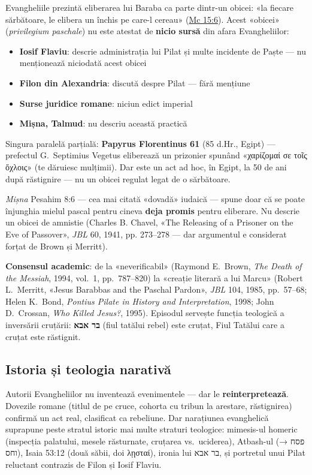 \documentclass[12pt,a4paper,twoside,openany]{book}
\begin{document}
Evangheliile prezintă eliberarea lui Baraba ca parte dintr-un obicei: «la fiecare sărbătoare, le elibera un închis pe care-l cereau» (\href{https://bibliaortodoxa.ro/carte.php?id=53\&cap=15\#6}{Mc 15:6}). Acest «obicei» (\textit{privilegium paschale}) nu este atestat de \textbf{nicio sursă} din afara Evangheliilor:

\begin{itemize}
  \item \textbf{Iosif Flaviu}: descrie administrația lui Pilat și multe incidente de Paște — nu menționează niciodată acest obicei
  \item \textbf{Filon din Alexandria}: discută despre Pilat — fără mențiune
  \item \textbf{Surse juridice romane}: niciun edict imperial
  \item \textbf{Mișna, Talmud}: nu descriu această practică
\end{itemize}

Singura paralelă parțială: \textbf{Papyrus Florentinus 61} (85 d.Hr., Egipt) — prefectul G.~Septimius Vegetus eliberează un prizonier spunând «χαρίζομαί σε τοῖς ὄχλοις» (te dăruiesc mulțimii). Dar este un act ad hoc, în Egipt, la 50 de ani după răstignire — nu un obicei regulat legat de o sărbătoare.

\textit{Mișna} Pesahim 8:6 — cea mai citată «dovadă» iudaică — spune doar că se poate înjunghia mielul pascal pentru cineva \textbf{deja promis} pentru eliberare. Nu descrie un obicei de amnistie (Charles B. Chavel, «The Releasing of a Prisoner on the Eve of Passover», \textit{JBL} 60, 1941, pp. 273--278 — dar argumentul e considerat forțat de Brown și Merritt).

\textbf{Consensul academic}: de la «neverificabil» (Raymond E.~Brown, \textit{The Death of the Messiah}, 1994, vol.~1, pp.~787--820) la «creație literară a lui Marcu» (Robert L.~Merritt, «Jesus Barabbas and the Paschal Pardon», \textit{JBL} 104, 1985, pp.~57--68; Helen K.~Bond, \textit{Pontius Pilate in History and Interpretation}, 1998; John D.~Crossan, \textit{Who Killed Jesus?}, 1995). Episodul servește funcția teologică a inversării cruțării: \textbf{בר אבא} (fiul tatălui rebel) este cruțat, Fiul Tatălui care a cruțat este răstignit.

\subsection{Istoria și teologia narativă}

Autorii Evangheliilor nu inventează evenimentele — dar le \textbf{reinterpretează}. Dovezile romane (titlul de pe cruce, cohorta cu tribun la arestare, răstignirea) confirmă un act real, clasificat ca rebeliune. Dar narațiunea evanghelică suprapune peste stratul istoric mai multe straturi teologice: mimesis-ul homeric (inspecția palatului, mesele răsturnate, cruțarea vs.\ uciderea), Atbash-ul (פסח → וחס), Isaia 53:12 (două săbii, doi λῃσταί), ironia lui בר אבא, și portretul unui Pilat reluctant contrazis de Filon și Iosif Flaviu.
\end{document}
